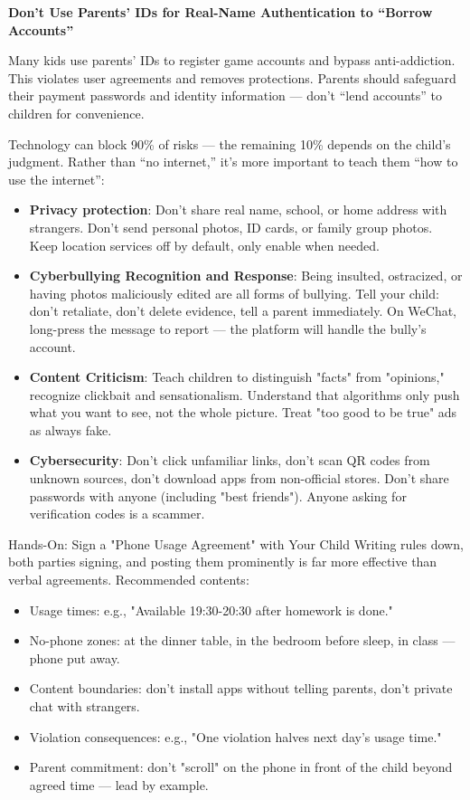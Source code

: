 \textbf{Don't Use Parents' IDs for Real-Name Authentication to “Borrow Accounts”}\par

Many kids use parents' IDs to register game accounts and bypass anti-addiction. This violates user agreements and removes protections. Parents should safeguard their payment passwords and identity information — don't “lend accounts” to children for convenience.


Technology can block 90\% of risks — the remaining 10\% depends on the child's judgment. Rather than “no internet,” it's more important to teach them “how to use the internet”:

\begin{itemize}
  \item \textbf{Privacy protection}: Don't share real name, school, or home address with strangers. Don't send personal photos, ID cards, or family group photos. Keep location services off by default, only enable when needed.
  \item \textbf{Cyberbullying Recognition and Response}: Being insulted, ostracized, or having photos maliciously edited are all forms of bullying. Tell your child: don't retaliate, don't delete evidence, tell a parent immediately. On WeChat, long-press the message to report — the platform will handle the bully's account.
  \item \textbf{Content Criticism}: Teach children to distinguish "facts" from "opinions," recognize clickbait and sensationalism. Understand that algorithms only push what you want to see, not the whole picture. Treat "too good to be true" ads as always fake.
  \item \textbf{Cybersecurity}: Don't click unfamiliar links, don't scan QR codes from unknown sources, don't download apps from non-official stores. Don't share passwords with anyone (including "best friends"). Anyone asking for verification codes is a scammer.
\end{itemize}

\begin{tcbpractice}{Hands-On: Sign a "Phone Usage Agreement" with Your Child}
Writing rules down, both parties signing, and posting them prominently is far more effective than verbal agreements. Recommended contents:

\begin{itemize}
  \item Usage times: e.g., "Available 19:30-20:30 after homework is done."
  \item No-phone zones: at the dinner table, in the bedroom before sleep, in class — phone put away.
  \item Content boundaries: don't install apps without telling parents, don't private chat with strangers.
  \item Violation consequences: e.g., "One violation halves next day's usage time."
  \item Parent commitment: don't "scroll" on the phone in front of the child beyond agreed time — lead by example.
\end{itemize}

\end{tcbpractice}

